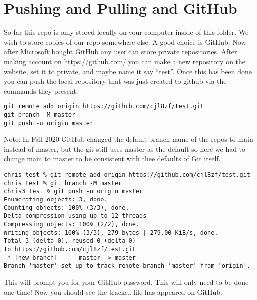 \documentclass{article}
\begin{document}
\section{Pushing and Pulling and GitHub}
So far this repo is only stored locally on your computer inside of
this folder. We wish to store copies of our repo somewhere else. A
good choice is GitHub. Now after Microsoft bought GitHub any user can
store private repositories. After making account on
\href{https://github.com/}{https://github.com/} you can make a new
repository on the website, set it to private, and maybe name it say
``test''. Once this has been done you can push the local repository
that was just created to github via the commands they present:
\begin{lstlisting}
git remote add origin https://github.com/cjl8zf/test.git
git branch -M master
git push -u origin master
\end{lstlisting}
Note: In Fall 2020 GitHub changed the default branch name of the repos
to main instead of master, but the git still uses master as the
default so here we had to change main to master to be consistent with
thee defaults of Git itself.
\begin{lstlisting}
chris test % git remote add origin https://github.com/cjl8zf/test.git 
chris test % git branch -M master
chris3 test % git push -u origin master 
Enumerating objects: 3, done.
Counting objects: 100% (3/3), done.
Delta compression using up to 12 threads
Compressing objects: 100% (2/2), done.
Writing objects: 100% (3/3), 279 bytes | 279.00 KiB/s, done.
Total 3 (delta 0), reused 0 (delta 0)
To https://github.com/cjl8zf/test.git
 * [new branch]      master -> master
Branch 'master' set up to track remote branch 'master' from 'origin'.
\end{lstlisting}
This will prompt you for your GitHub password. This will only need to
be done one time! Now you should see the tracked file has appeared on GitHub.
\end{document}
